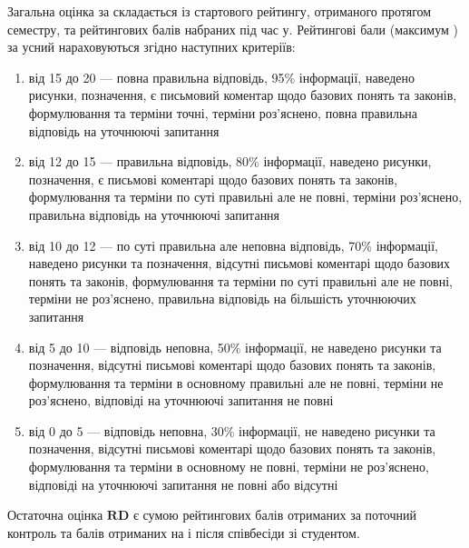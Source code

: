 \documentclass{Syllabus}
\begin{document}
Загальна оцінка за \control{} складається із стартового рейтингу, отриманого протягом семестру, та рейтингових балів набраних під час \control у. Рейтингові бали (максимум \controlBalUsno) за усний \control{} нараховуються згідно наступних критеріїв:
\begin{enumerate}[label=$\bullet$]
    \item від 15 до 20 --- повна правильна відповідь, 95\% інформації, наведено рисунки, позначення, є письмовий коментар щодо базових понять та законів, формулювання та терміни точні, терміни роз’яснено, повна правильна відповідь на уточнюючі запитання
    \item від 12 до 15 --- правильна відповідь, 80\% інформації, наведено рисунки, позначення, є письмові коментарі щодо базових понять та законів, формулювання та терміни по суті правильні але не повні, терміни роз’яснено, правильна відповідь на уточнюючі запитання
    \item від 10 до 12 --- по суті правильна але неповна відповідь, 70\% інформації, наведено рисунки та позначення, відсутні письмові коментарі щодо базових понять та законів, формулювання та терміни по суті правильні але не повні, терміни не роз’яснено, правильна відповідь на більшість уточнюючих запитання
    \item від 5 до 10 --- відповідь неповна, 50\% інформації, не наведено рисунки та позначення, відсутні письмові коментарі щодо базових понять та законів, формулювання та терміни в основному правильні але не повні, терміни не роз’яснено, відповіді на уточнюючі запитання не повні
    \item від 0 до 5 --- відповідь неповна, 30\% інформації, не наведено рисунки та позначення, відсутні письмові коментарі щодо базових понять та законів, формулювання та терміни в основному не повні, терміни не роз’яснено, відповіді на уточнюючі запитання не повні або відсутні
\end{enumerate}


Остаточна оцінка $\mathbf{RD}$ є сумою рейтингових балів отриманих за поточний контроль та балів отриманих на \control і після співбесіди зі студентом.
\end{document}
